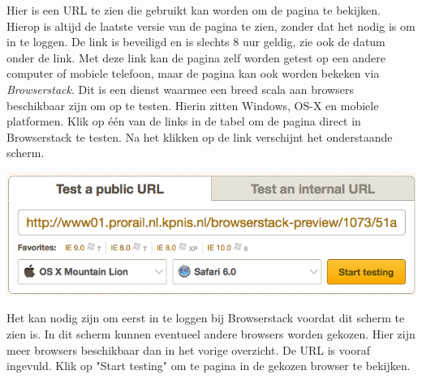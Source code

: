Hier is een URL te zien die gebruikt kan worden om de pagina te bekijken. Hierop is altijd de laatste versie van de pagina te zien, zonder dat het nodig is om in te loggen. De link is beveiligd en is slechts 8 uur geldig, zie ook de datum onder de link. Met deze link kan de pagina zelf worden getest op een andere computer of mobiele telefoon, maar de pagina kan ook worden bekeken via \emph{Browserstack}. Dit is een dienst waarmee een breed scala aan browsers beschikbaar zijn om op te testen. Hierin zitten Windows, OS-X en mobiele platformen. Klik op \'{e}\'{e}n van de links in de tabel om de pagina direct in Browserstack te testen. Na het klikken op de link verschijnt het onderstaande scherm.

\begin{center}
\includegraphics[width=\textwidth]{img/browserstack2.png}
\end{center}

Het kan nodig zijn om eerst in te loggen bij Browserstack voordat dit scherm te zien is. In dit scherm kunnen eventueel andere browsers worden gekozen. Hier zijn meer browsers beschikbaar dan in het vorige overzicht. De URL is vooraf ingevuld. Klik op "Start testing" om te pagina in de gekozen browser te bekijken.




